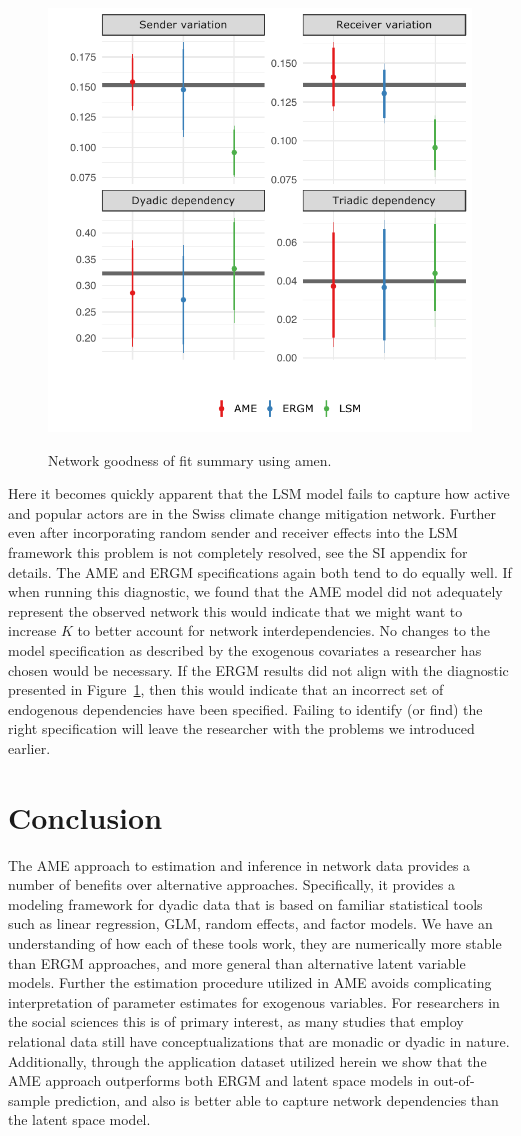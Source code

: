 \documentclass[9pt,twocolumn,twoside,lineno]{pnas-new}
\newcommand{\pkg}[1]{{\fontseries{b}\selectfont #1}}
\begin{document}
\begin{figure}[ht]
	\centering
	\caption{Network goodness of fit summary using \pkg{amen}.}
	\includegraphics[width=.5\textwidth]{netPerfCoef_vert}
	\label{fig:ergmAmePerf}
\end{figure}
\FloatBarrier

Here it becomes quickly apparent that the LSM model fails to capture how active and popular actors are in the Swiss climate change mitigation network. Further even after incorporating random sender and receiver effects into the LSM framework this problem is not completely resolved, see the SI appendix for details. The AME and ERGM specifications again both tend to do equally well. If when running this diagnostic, we found that the AME model did not adequately represent the observed network this would indicate that we might want to increase $K$ to better account for network interdependencies. No changes to the model specification as described by the exogenous covariates a researcher has chosen would be necessary. If the ERGM results did not align with the diagnostic presented in Figure~\ref{fig:ergmAmePerf}, then this would indicate that an incorrect set of endogenous dependencies have been specified. Failing to identify (or find) the right specification will leave the researcher with the problems we introduced earlier.

\section*{\textbf{Conclusion}}

The AME approach to estimation and inference in network data provides a number of benefits over alternative approaches. Specifically, it provides a modeling framework for dyadic data that is based on familiar statistical tools such as linear regression, GLM, random effects, and factor models. We have an understanding of how each of these tools work, they are numerically more stable than ERGM approaches, and more general than alternative latent variable models. Further the estimation procedure utilized in AME avoids complicating interpretation of parameter estimates for exogenous variables. For researchers in the social sciences this is of primary interest, as many studies that employ relational data still have conceptualizations that are monadic or dyadic in nature. Additionally, through the application dataset utilized herein we show that the AME approach outperforms both ERGM and latent space models in out-of-sample prediction, and also is better able to capture network dependencies than the latent space model.
\end{document}
